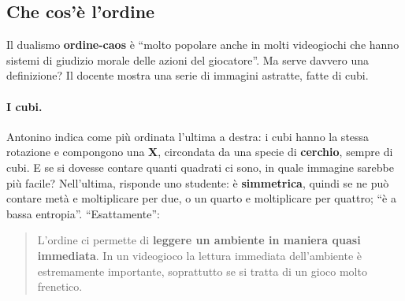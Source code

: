 \subsection{Che cos'è l'ordine}

Il dualismo \textbf{ordine-caos} è ``molto popolare anche in molti videogiochi che
hanno sistemi di giudizio morale delle azioni del giocatore''. Ma serve davvero una
definizione? Il docente mostra una serie di immagini astratte, fatte di cubi.

\paragraph{I cubi.} Antonino indica come più ordinata l'ultima a destra: i cubi hanno la
stessa rotazione e compongono una \textbf{X}, circondata da una specie di
\textbf{cerchio}, sempre di cubi. E se si dovesse contare quanti quadrati ci sono, in
quale immagine sarebbe più facile? Nell'ultima, risponde uno studente: è
\textbf{simmetrica}, quindi se ne può contare metà e moltiplicare per due, o un quarto e
moltiplicare per quattro; ``è a bassa entropia''. ``Esattamente'':
\begin{quote}
L'ordine ci permette di \textbf{leggere un ambiente in maniera quasi immediata}. In un
videogioco la lettura immediata dell'ambiente è estremamente importante, soprattutto se
si tratta di un gioco molto frenetico.
\end{quote}

